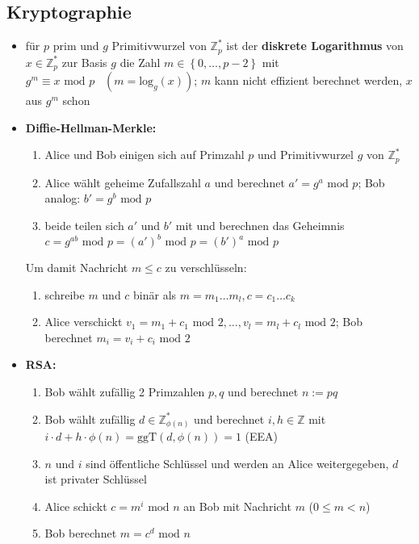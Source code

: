 \documentclass[10pt,a4paper]{article}
\begin{document}
\subsection{Kryptographie}
\begin{itemize}
\item für $p$ prim und $g$ Primitivwurzel von $\mathbb{Z}_{p}^{*}$ ist der \textbf{diskrete Logarithmus} von $x \in \mathbb{Z}_{p}^{*}$ zur Basis $g$ die Zahl $m\in \left\lbrace 0,\dotsc,p-2\right\rbrace$ mit  $g^{m}\equiv x \text{ mod } p\;\;\; (m=\text{log}_{g}(x))$; $m$ kann nicht effizient berechnet werden, $x$ aus $g^{m}$ schon
\item \textbf{Diffie-Hellman-Merkle:}
\begin{enumerate}
\item Alice und Bob einigen sich auf Primzahl $p$ und Primitivwurzel $g$ von $\mathbb{Z}_{p}^{*}$
\item Alice wählt geheime Zufallszahl $a$ und berechnet $a'=g^{a} \text{ mod } p$; Bob analog: $b'=g^{b} \text{ mod } p$
\item beide teilen sich $a'$ und $b'$ mit und berechnen das Geheimnis $c=g^{ab} \text{ mod } p=(a')^{b} \text{ mod } p=(b')^{a} \text{ mod } p$
\end{enumerate}
Um damit Nachricht $m\leq c$ zu verschlüsseln:
\begin{enumerate}
\item  schreibe $m$ und $c$ binär als $m=m_{1}\dotsc m_{l},c=c_{1}\dotsc c_{k}$
\item Alice verschickt $v_{1}=m_{1}+c_{1} \text{ mod } 2,\dotsc,v_{l}=m_{l}+c_{l} \text{ mod } 2$; Bob berechnet $m_{i}=v_{i}+c_{i} \text{ mod } 2$
\end{enumerate}
\item \textbf{RSA:}
\begin{enumerate}
\item Bob wählt zufällig 2 Primzahlen $p,q$ und berechnet $n:=pq$
\item Bob wählt zufällig $d\in \mathbb{Z}_{\phi(n)}^{*}$ und berechnet $i,h\in \mathbb{Z}$ mit $ i\cdot d+h\cdot \phi(n)=\text{ggT}(d,\phi(n))=1$ (EEA)


\item $n$ und $i$ sind öffentliche Schlüssel und werden an Alice weitergegeben, $d$ ist privater Schlüssel
\item Alice schickt $c=m^{i} \text{ mod } n$ an Bob mit Nachricht $m$ ($0\leq m <n$) 
\item Bob berechnet $m=c^{d} \text{ mod } n$ 
\end{enumerate}
\end{itemize}
\end{document}
